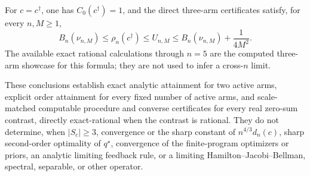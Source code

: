 For \(c=c^\dagger\), one has \(C_0(c^\dagger)=1\), and the direct three-arm certificates satisfy, for every \(n,M\geq1\),
\[
 B_n(\nu_{n,M})\leq\rho_n(c^\dagger)\leq U_{n,M}
 \leq B_n(\nu_{n,M})+\frac1{4M^2}.
\]
The available exact rational calculations through \(n=5\) are the computed three-arm showcase for this formula; they are not used to infer a cross-\(n\) limit.

These conclusions establish exact analytic attainment for two active arms, explicit order attainment for every fixed number of active arms, and scale-matched computable procedure and converse certificates for every real zero-sum contrast, directly exact-rational when the contrast is rational.  They do not determine, when \(|S_c|\geq3\), convergence or the sharp constant of \(n^{4/3}d_n(c)\), sharp second-order optimality of \(q^\star\), convergence of the finite-program optimizers or priors, an analytic limiting feedback rule, or a limiting Hamilton--Jacobi--Bellman, spectral, separable, or other operator.